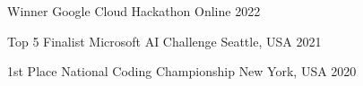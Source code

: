 \documentclass[11pt, a4paper]{awesome-cv}
\begin{document}


\begin{cvhonors}

\cvhonor
    {Winner} %
    {Google Cloud Hackathon} %
    {Online} %
    {2022} %

\cvhonor
    {Top 5 Finalist} %
    {Microsoft AI Challenge} %
    {Seattle, USA} %
    {2021} %

\end{cvhonors}

\medskip
{}

\begin{cvhonors}

\cvhonor
    {1st Place} %
    {National Coding Championship} %
    {New York, USA} %
    {2020} %

\end{cvhonors}

\end{document}
